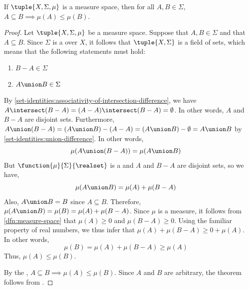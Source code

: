 \begin{thm}[Monotonicity]
     \label{thm:measure-space-monotonicity}
    If \( \tuple{X, \Sigma, \mu} \) is a measure space, then for all \( A, B \in \Sigma \), \( A \subseteq B {\implies} \mu(A) \leq \mu(B) \).
\end{thm}

\begin{proof}
    Let \( \tuple{X, \Sigma, \mu} \) be a measure space. Suppose that \( A, B \in \Sigma \) and that \( A \subseteq B \).
    Since \( \Sigma \) is a  over \( X \), it follows that \( \tuple{X, \Sigma} \) is
    a field of sets, which means that the following statements must hold:
    \begin{enumerate}[topsep=2pt,label=\textup{\texttt{(\arabic*)}}]
        \item \( B - A \in \Sigma \)
        \item \( A \union B \in \Sigma \)
    \end{enumerate}
    By \cref{set-identities:associativity-of-intersection-difference},
    we have \( A \intersect \mleft( B - A \mright) = \mleft( A - A \mright) \intersect \mleft( B - A \mright) = \emptyset \).
    In other words, \( A \) and \( B - A \) are disjoint sets.
    Furthermore, \( A \union \mleft( B - A \mright) = \mleft( A \union B \mright) - \mleft( A - A \mright) = \mleft( A \union B \mright) - \emptyset = A \union B \) by
    \cref{set-identities:union-difference}.
    In other words,
    \begin{equation*}
        \mu(A \union \mleft( B - A \mright)) = \mu(A \union B)
    \end{equation*}
    But \( \function{\mu}{\Sigma}{\realset} \) is a  and \( A \) and \( B - A \) are disjoint sets,
    so we have,
    \begin{equation*}
        \mu(A \union B) = \mu(A) + \mu(B - A)
    \end{equation*}
    Also, \( A \union B = B \) since \( A \subseteq B \). Therefore, \( \mu(A \union B) = \mu(B) = \mu(A) + \mu(B - A) \).
    Since \( \mu \) is a measure, it follows from \cref{dfn:measure-space} that \( \mu(A) \geq 0 \) and \( \mu(B - A) \geq 0 \).
    Using the familiar property of real numbers, we thus infer that \( \mu(A) + \mu(B - A) \geq 0 + \mu(A)\).
    In other words,
    \begin{equation*}
        \mu(B) = \mu(A) + \mu(B - A) \geq \mu(A)
    \end{equation*}
    Thus, \( \mu(A) \leq \mu(B) \).

    \vspace{0.3cm}
    \noindent
    By the ,
    \( A \subseteq B {\implies} \mu(A) \leq \mu(B) \).
    Since \( A \) and \( B \) are arbitrary, the theorem follows from .
\end{proof}

